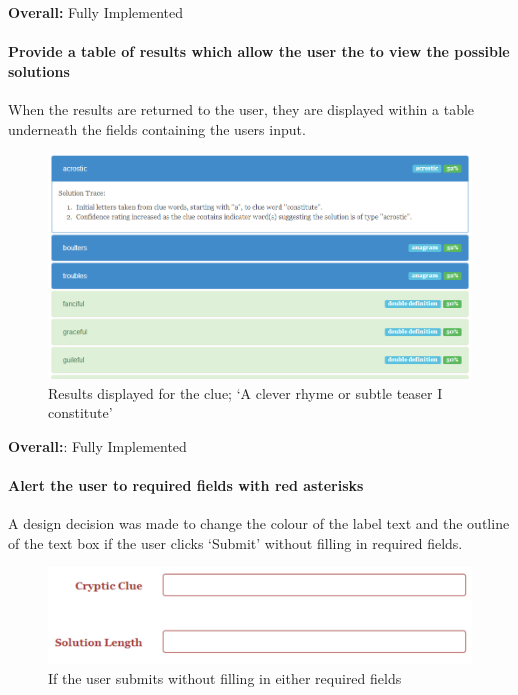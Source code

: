 {\bf Overall:} Fully Implemented

\paragraph{Provide a table of results which allow the user the to
view the possible solutions}

When the results are returned to the user, they are displayed within a table 
underneath the fields containing the users input. 

\begin{figure}[H]
	\centering
	\includegraphics[keepaspectratio=true,scale=0.6]{evidence/listsolutions.png}
	\caption{Results displayed for the clue; `A clever rhyme or subtle teaser I constitute'}
\end{figure}

{\bf Overall:}: Fully Implemented

\paragraph{Alert the user to required fields with red asterisks}
   A design decision was made to change the colour of the label text 
and the outline of the text box if the user clicks `Submit' without filling in
 required fields.

\begin{figure}[H]
	\centering
	\includegraphics[keepaspectratio=true]{evidence/alert1.png}
	\caption{If the user submits without filling in either required fields}
\end{figure}

